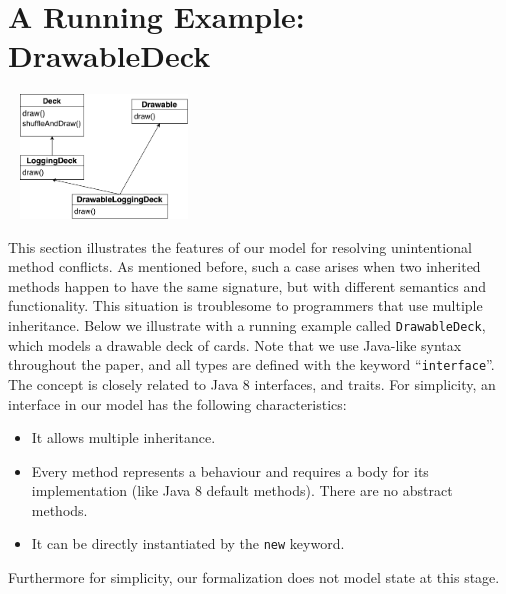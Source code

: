 \section{A Running Example: DrawableDeck}~\label{sec:overview}
\includegraphics[height=3.3cm]{pics/DrawableLoggingDeck.pdf}

This section illustrates the features of our \MIM{} model for
resolving unintentional method conflicts. As mentioned before, such a
case arises when two inherited methods happen to have the same
signature, but with different semantics and functionality. This
situation is troublesome to programmers that use multiple
inheritance. Below we illustrate with a running example called
\lstinline|DrawableDeck|, which models a drawable deck of cards. 
Note that we use Java-like syntax
throughout the paper, and all types are defined with the keyword
``\lstinline|interface|''. The concept is closely related to Java 8
interfaces, and traits. For simplicity, an interface in our model has
the following characteristics:
\begin{itemize}
	\item It allows multiple inheritance.
	\item Every method represents a behaviour and requires a body for its implementation (like Java 8 default methods). There are no abstract methods.
	\item It can be directly instantiated by the \lstinline|new| keyword.
\end{itemize}
Furthermore for simplicity, our formalization does not model state at
this stage. %

